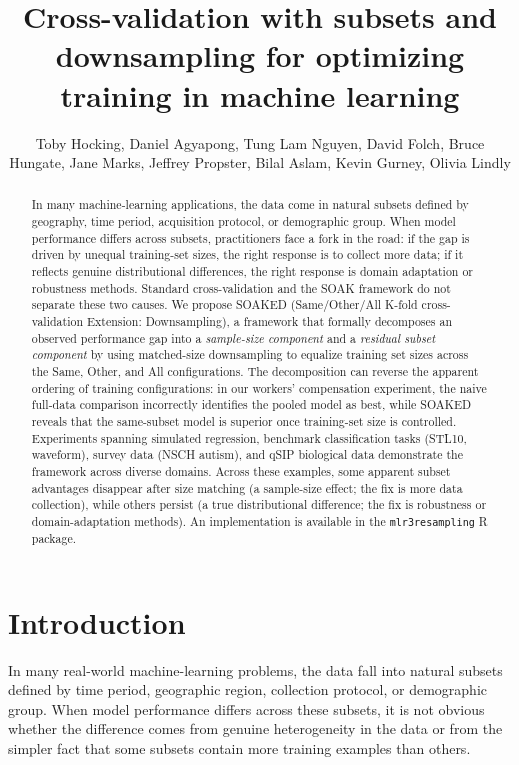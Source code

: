 \documentclass{article}
\title{Cross-validation with subsets and downsampling for optimizing training in machine learning}
\author{Toby Hocking, 
Daniel Agyapong, Tung Lam Nguyen, David Folch, Bruce Hungate, Jane Marks, Jeffrey Propster, Bilal Aslam, Kevin Gurney, Olivia Lindly
}
\begin{document}
\maketitle


\begin{abstract}
In many machine-learning applications, the data come in natural subsets defined by geography, time period, acquisition protocol, or demographic group.
When model performance differs across subsets, practitioners face a fork in the road: if the gap is driven by unequal training-set sizes, the right response is to collect more data; if it reflects genuine distributional differences, the right response is domain adaptation or robustness methods.
Standard cross-validation and the SOAK framework \citep{hocking2026} do not separate these two causes.
We propose SOAKED (Same/Other/All K-fold cross-validation Extension: Downsampling), a framework that formally decomposes an observed performance gap into a \emph{sample-size component} and a \emph{residual subset component} by using matched-size downsampling to equalize training set sizes across the Same, Other, and All configurations.
The decomposition can reverse the apparent ordering of training configurations: in our workers' compensation experiment, the naive full-data comparison incorrectly identifies the pooled model as best, while SOAKED reveals that the same-subset model is superior once training-set size is controlled.
Experiments spanning simulated regression, benchmark classification tasks (STL10, waveform), survey data (NSCH autism), and qSIP biological data demonstrate the framework across diverse domains.
Across these examples, some apparent subset advantages disappear after size matching (a sample-size effect; the fix is more data collection), while others persist (a true distributional difference; the fix is robustness or domain-adaptation methods).
An implementation is available in the \texttt{mlr3resampling} R package.
\end{abstract}


\section{Introduction}
In many real-world machine-learning problems, the data fall into natural subsets defined by time period, geographic region, collection protocol, or demographic group.
When model performance differs across these subsets, it is not obvious whether the difference comes from genuine heterogeneity in the data or from the simpler fact that some subsets contain more training examples than others.
\end{document}
